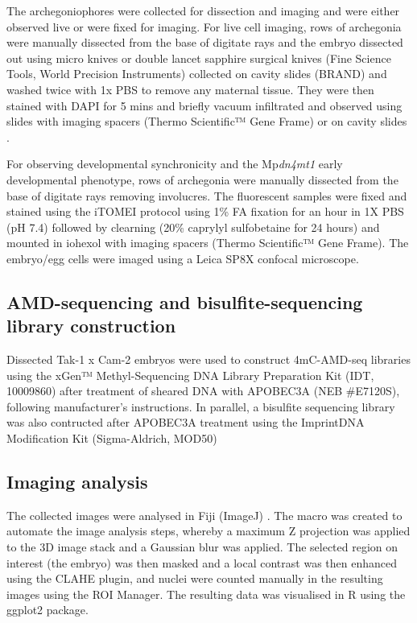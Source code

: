 The archegoniophores were collected for dissection and imaging and were either observed live or were fixed for imaging. For live cell imaging, rows of archegonia were manually dissected from the base of digitate rays and the embryo dissected out using micro knives or double lancet sapphire surgical knives (Fine Science Tools, World Precision Instruments) collected on cavity slides (BRAND\textregistered) and washed twice with 1x PBS to remove any maternal tissue. They were then stained with DAPI for 5 mins and briefly vacuum infiltrated and observed using slides with imaging spacers (Thermo Scientific™ Gene Frame) or on cavity slides \cite{RN139}. 

For observing developmental synchronicity and the Mp\textit{dn4mt1} early developmental phenotype,  rows of archegonia were manually dissected from the base of digitate rays removing involucres. The fluorescent samples were fixed and stained using the iTOMEI protocol \cite{RN148} using 1\% FA fixation for an hour in 1X PBS (pH 7.4) followed by clearning (20\% caprylyl sulfobetaine for 24 hours) and mounted in iohexol with imaging spacers (Thermo Scientific™ Gene Frame). The embryo/egg cells were imaged using a Leica SP8X confocal microscope.

\subsection{AMD-sequencing and bisulfite-sequencing library construction}

Dissected Tak-1 x Cam-2 embryos were used to construct 4mC-AMD-seq libraries using the xGen™ Methyl-Sequencing DNA Library Preparation Kit (IDT, 10009860) after treatment of sheared DNA with APOBEC3A (NEB \#E7120S), following manufacturer’s instructions. In parallel, a bisulfite sequencing library was also contructed after APOBEC3A treatment using the Imprint\textregistered DNA Modification Kit (Sigma-Aldrich, MOD50)


\subsection{Imaging analysis}

The collected images were analysed in Fiji (ImageJ) \cite{RN266}. The macro was created to automate the image analysis steps, whereby a maximum Z projection was applied to the 3D image stack and a Gaussian blur was applied. The selected region on interest (the embryo) was then masked and a local contrast was then enhanced using the CLAHE plugin, and nuclei were counted manually in the resulting images using the ROI Manager. The resulting data was visualised in R using the ggplot2 package.

